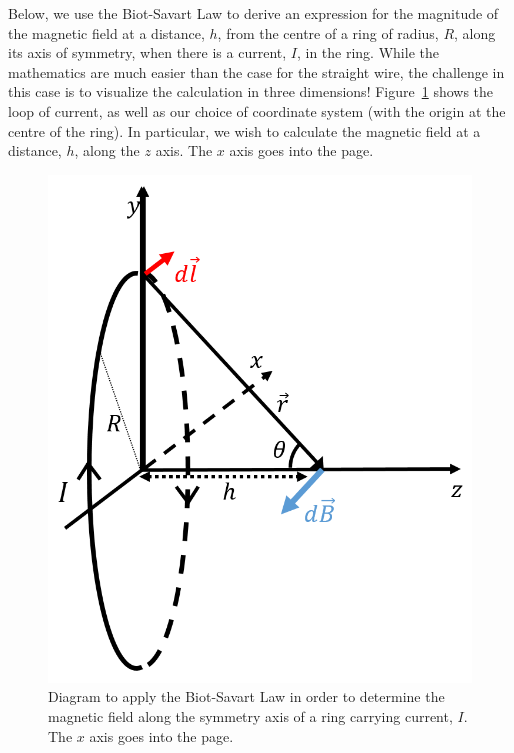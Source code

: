 Below, we use the Biot-Savart Law to derive an expression for the magnitude of the magnetic field at a distance, $h$, from the centre of a ring of radius, $R$, along its axis of symmetry, when there is a current, $I$, in the ring. While the mathematics are much easier than the case for the straight wire, the challenge in this case is to visualize the calculation in three dimensions! Figure~\ref{fig:magneticsource:bsring} shows the loop of current, as well as our choice of coordinate system (with the origin at the centre of the ring). In particular, we wish to calculate the magnetic field at a distance, $h$, along the $z$ axis. The $x$ axis goes into the page.

\begin{figure}[!htbp]
\centering
\includegraphics[width=0.4\linewidth]{files/bsring-740662e1ad7007d0abe905f8a7c59235.png}
\caption[]{Diagram to apply the Biot-Savart Law in order to determine the magnetic field along the symmetry axis of a ring carrying current, $I$. The $x$ axis goes into the page.}
\label{fig:magneticsource:bsring}
\end{figure}

